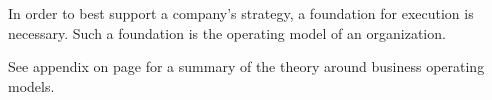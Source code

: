 In order to best support a company's strategy, a foundation for execution is necessary.
Such a foundation is the operating model of an organization.

See appendix  on page \pageref{ch:operating-model} for a summary of the theory around
business operating models.


